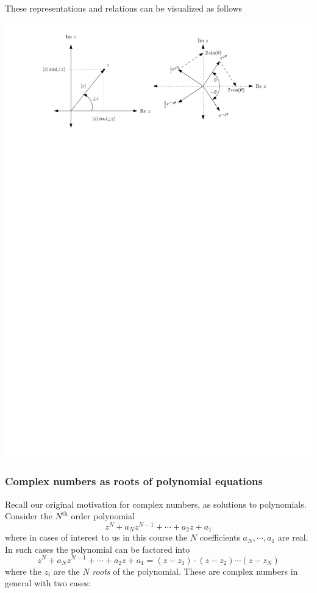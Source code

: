 These representations and relations can be visualized as follows
\begin{center}
  \includegraphics[scale=1]{graphics/complex-viz-prereq.pdf}
\end{center}

\subsubsection*{Complex numbers as roots of polynomial equations}

Recall our original motivation for complex numbers, as solutions to polynomials. Consider the $N^\text{th}$ order polynomial
\[
z^N + a_N z^{N-1} + \cdots + a_2 z + a_1 
\]
where in cases of interest to us in this course the $N$ coefficients $a_{N}, \cdots, a_1$ are real. In such cases the polynomial can be factored into
\[
z^N + a_{N} z^{N-1} + \cdots + a_2 z + a_1 = (z-z_1)\cdot(z-z_2)\cdots(z-z_N)
\]
where the $z_i$ are the $N$ \textit{roots} of the polynomial. These are complex numbers in general with two cases:

